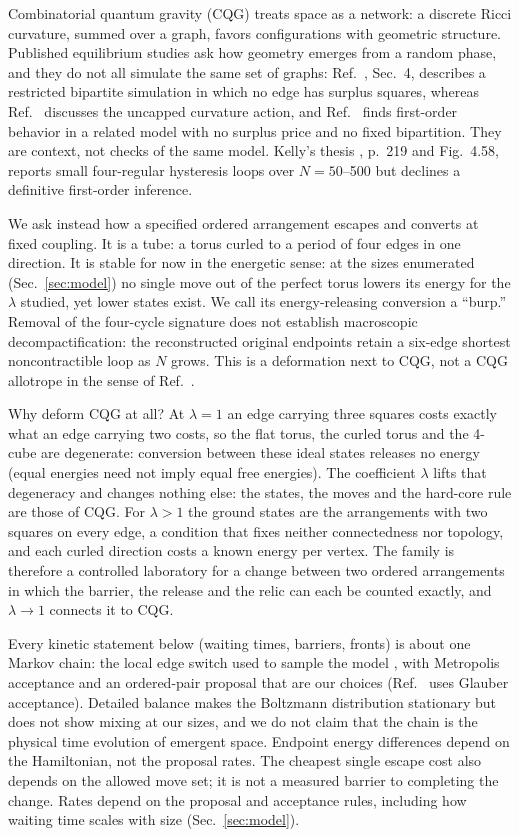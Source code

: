 \documentclass[aps,pre,10pt,twocolumn,superscriptaddress,nofootinbib]{revtex4-2}
\begin{document}
Combinatorial quantum gravity (CQG) \cite{T17,KTB19,T25} treats space as a network: a discrete Ricci
curvature, summed over a graph, favors configurations with geometric structure. Published equilibrium
studies ask how geometry emerges from a random phase, and they do not all simulate the same set of
graphs: Ref.~\cite{KTB19}, Sec.~4, describes a restricted bipartite simulation in which no edge has surplus
squares, whereas Ref.~\cite{T25} discusses the uncapped curvature action, and Ref.~\cite{GV21} finds
first-order behavior in a related model with no surplus price and no fixed bipartition. They are
context, not checks of the same model. Kelly's thesis \cite{Kelly22}, p.~219 and Fig.~4.58,
reports small four-regular hysteresis loops over $N=50$--500 but declines a definitive first-order
inference.

We ask instead how a specified ordered arrangement escapes and converts at fixed coupling. It is a
tube: a torus curled to a period of four edges in one direction. It is stable for now
in the energetic sense: at the sizes enumerated (Sec.~\ref{sec:model}) no single move out of the
perfect torus lowers its energy for the $\lambda$ studied, yet lower states exist. We call its
energy-releasing conversion a ``burp.'' Removal of the four-cycle signature does not establish
macroscopic decompactification: the reconstructed original endpoints retain a six-edge shortest
noncontractible loop as $N$ grows. This is a
deformation next to CQG, not a CQG allotrope in the sense of Ref.~\cite{T24}.

Why deform CQG at all? At $\lambda=1$ an edge carrying three squares costs exactly what an edge
carrying two costs, so the flat torus, the curled torus and the 4-cube are degenerate: conversion
between these ideal states releases no energy (equal energies need not imply equal free energies).
The coefficient
$\lambda$ lifts that degeneracy and changes nothing else: the states, the moves and the hard-core rule
are those of CQG. For $\lambda>1$ the ground states are the arrangements with two squares on every
edge, a condition that fixes neither connectedness nor topology, and each curled direction costs a
known energy per vertex. The family is therefore a controlled laboratory for a change between two
ordered arrangements in which the barrier, the release and the relic can each be counted exactly, and
$\lambda\to1$ connects it to CQG.

Every kinetic statement below (waiting times, barriers, fronts) is about one
Markov chain: the local edge switch used to sample the model \cite{KTB19}, with Metropolis acceptance
and an ordered-pair proposal that are our choices (Ref.~\cite{T25} uses Glauber acceptance). Detailed
balance makes the Boltzmann distribution stationary but does not show mixing at our sizes, and we do not
claim that the chain is the physical time evolution of emergent space. Endpoint energy differences
depend on the Hamiltonian, not the proposal rates. The cheapest single escape cost also depends on
the allowed move set; it is not a measured barrier to completing the change. Rates depend on the proposal and
acceptance rules, including how waiting time scales with size (Sec.~\ref{sec:model}).
\end{document}
